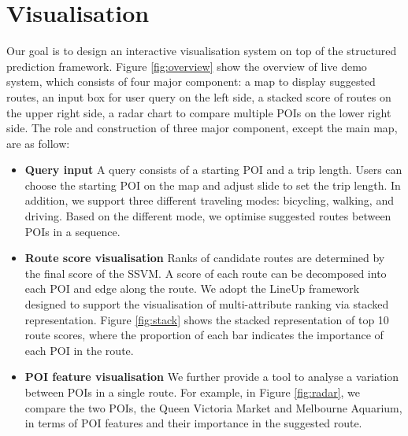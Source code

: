 \documentclass[sigconf]{acmart}
\begin{document}
\section{Visualisation}
Our goal is to design an interactive visualisation system on top of the structured prediction framework.
Figure \ref{fig:overview} show the overview of live demo system, which consists of four major component: a map to display suggested routes, an input box for user query on the left side, a stacked score of routes on the upper right side, a radar chart to compare multiple  POIs on the lower right side. The role and construction of three major component, except the main map, are as follow:
\begin{itemize}
\item \textbf{Query input} A query consists of a starting POI and a trip length. Users can choose the starting POI on the map and adjust slide to set the trip length. In addition, we support three different traveling modes: bicycling, walking, and driving. Based on the different mode, we optimise suggested routes between POIs in a sequence.
\item \textbf{Route score visualisation} Ranks of candidate routes are determined by the final score of the SSVM. A score of each route can be decomposed into each POI and edge along the route. We adopt the LineUp framework~\cite{gratzl2013lineup} designed to support the visualisation of multi-attribute ranking via stacked representation. Figure \ref{fig:stack} shows the stacked representation of top 10 route scores, where the proportion of each bar indicates the importance of each POI in the route.
\item \textbf{POI feature visualisation} We further provide a tool to analyse a variation between POIs in a single route. For example, in Figure \ref{fig:radar}, we compare the two POIs, the Queen Victoria Market and Melbourne Aquarium, in terms of POI features and their importance in the suggested route. 
\end{itemize}
\end{document}
